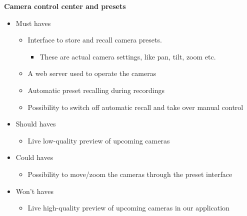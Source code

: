 \begin{large}
\textbf{Camera control center and presets}
\end{large}
\begin{itemize}
\item Must haves
\begin{itemize}
\item Interface to store and recall camera presets.
\begin{itemize}
\item These are actual camera settings, like pan, tilt, zoom etc.
\end{itemize}
\item A web server used to operate the cameras
\item Automatic preset recalling during recordings
\item Possibility to switch off automatic recall and take over manual control
\end{itemize}
\item Should haves
\begin{itemize}
\item Live low-quality preview of upcoming cameras
\end{itemize}
\item Could haves
\begin{itemize}
\item Possibility to move/zoom the cameras through the preset interface
\end{itemize}
\item Won't haves
\begin{itemize}
\item Live high-quality preview of upcoming cameras in our application
\end{itemize}
\end{itemize}